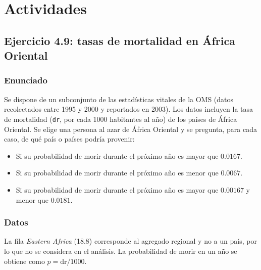 \documentclass[10pt]{article}
\begin{document}
\newpage
\tableofcontents
\thispagestyle{plain}
\clearpage

\section{Actividades}
 
\subsection{Ejercicio 4.9: tasas de mortalidad en África Oriental}
 
\subsubsection*{Enunciado}
Se dispone de un subconjunto de las estadísticas vitales de la OMS (datos recolectados entre 1995 y 2000 y reportados en 2003). Los datos incluyen la tasa de mortalidad (\texttt{dr}, por cada 1000 habitantes al año) de los países de África Oriental. Se elige una persona al azar de África Oriental y se pregunta, para cada caso, de qué país o países podría provenir:
\begin{itemize}
  \item Si su probabilidad de morir durante el próximo año es mayor que $0.0167$.
  \item Si su probabilidad de morir durante el próximo año es menor que $0.0067$.
  \item Si su probabilidad de morir durante el próximo año es mayor que $0.00167$ y menor que $0.0181$.
\end{itemize}
 
\subsubsection*{Datos}
La fila \textit{Eastern Africa} (18.8) corresponde al agregado regional y no a un país, por lo que no se considera en el análisis. La probabilidad de morir en un año se obtiene como $p = \mathrm{dr}/1000$.
 
\end{document}
